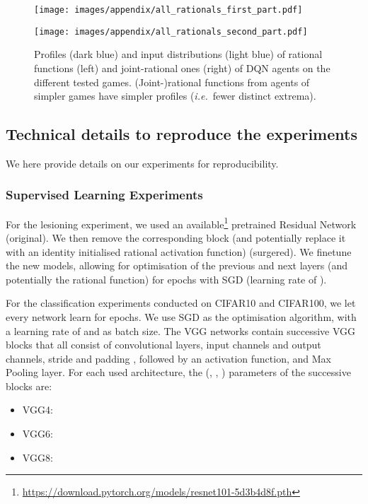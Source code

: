 \documentclass[accepted]{article}
\theoremstyle{plain}
\theoremstyle{definition}
\theoremstyle{remark}
\newcommand{\ie}{\emph{i.e.}~}
\begin{document}
\begin{figure}[H]
\centering
\texttt{[image: images/appendix/all\_rationals\_first\_part.pdf]} \end{figure}

\begin{figure}[H]
\centering
\texttt{[image: images/appendix/all\_rationals\_second\_part.pdf]}
\caption{Profiles (dark blue) and input distributions (light blue) of rational functions (left) and joint-rational ones (right) of DQN agents on the different tested games. (Joint-)rational functions from agents of simpler games have simpler profiles (\ie fewer distinct extrema).}
\label{fig:act_func_shapes}
\end{figure}









\subsection{Technical details to reproduce the experiments}
\label{app:experiments_details}
We here provide details on our experiments for reproducibility.
\subsubsection{Supervised Learning Experiments}
\label{app:details_sl}
For the lesioning experiment, we used an available\footnote{\url{https://download.pytorch.org/models/resnet101-5d3b4d8f.pth}} pretrained Residual Network (original). We then remove the corresponding block (and potentially replace it with an identity initialised rational activation function) (surgered). We finetune the new models, allowing for optimisation of the previous and next layers (and potentially the rational function) for  epochs with SGD (learning rate of ).

For the classification experiments conducted on CIFAR10 and CIFAR100, we let every network learn for  epochs. We use SGD as the optimisation algorithm, with a learning rate of  and  as batch size. The VGG networks contain successive VGG blocks that all consist of  convolutional layers,  input channels and  output channels, stride  and padding , followed by an activation function, and  Max Pooling layer. For each used architecture, the (, , ) parameters of the successive blocks are:

\begin{itemize}
    \item VGG4: 
    \item VGG6: 
    \item VGG8: 
\end{itemize}
\end{document}
